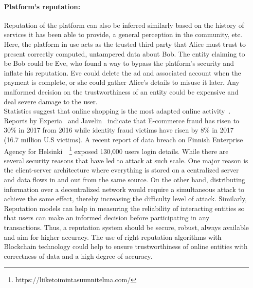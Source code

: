 \paragraph{Platform's reputation:} Reputation of the platform can also be
inferred similarly based on the history of services it has been able to
provide, a general perception in the community, etc.  Here, the platform in use
acts as the trusted third party that Alice must trust to present correctly
computed, untampered data about Bob. The entity claiming to be Bob could be
Eve, who found a way to bypass the platform's security and inflate his
reputation.  Eve could delete the ad and associated account when the payment is
complete, or she could gather Alice's details to misuse it later.  Any
malformed decision on the trustworthiness of an entity could be expensive and
deal severe damage to the user. \\
Statistics suggest that online shopping is the most adapted online
activity~\cite{experian}. Reports by Experia~\cite{experian} and
Javelin~\cite{javelin} indicate that E-commerce fraud has risen to
30\% in 2017 from 2016 while identity fraud victims have risen by 8\% in 2017
(16.7 million U.S victims). 
A recent report of data breach on Finnish Enterprise Agency for
Helsinki~\cite{finland}~\footnote{https://liiketoimintasuunnitelma.com/}
exposed 130,000 users login details.
While there are several security reasons that have led to attack at such scale.
One major reason is the client-server architecture where everything is stored
on a centralized server and data flows in and out from the same source. On the
other hand, distributing information over a decentralized network would require
a simultaneous attack to achieve the same effect, thereby increasing the
difficulty level of attack. Similarly, Reputation models can help in measuring
the reliability of interacting entities so that users can make an informed
decision before participating in any transactions. Thus, a reputation system
should be secure, robust, always available and aim for higher accuracy. The use
of right reputation algorithms with Blockchain technology could help to ensure
trustworthiness of online entities with correctness of data and a high degree
of accuracy.  

